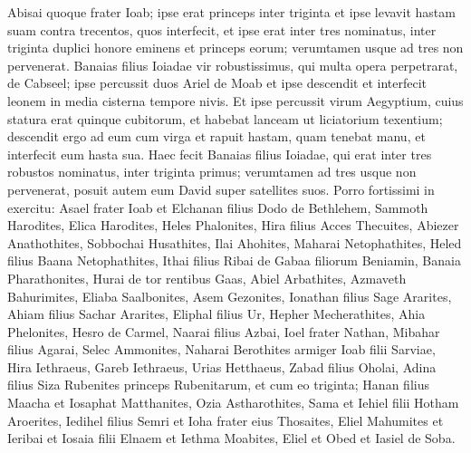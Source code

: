 \begin{biblechapter}
\verse Abisai quoque frater Ioab; ipse erat princeps inter triginta et ipse levavit hastam suam contra trecentos, quos interfecit, et ipse erat inter tres nominatus, 
\verse inter triginta duplici honore eminens et princeps eorum; verumtamen usque ad tres non pervenerat. 
\verse Banaias filius Ioiadae vir robustissimus, qui multa opera perpetrarat, de Cabseel; ipse percussit duos Ariel de Moab et ipse descendit et interfecit leonem in media cisterna tempore nivis. 
\verse Et ipse percussit virum Aegyptium, cuius statura erat quinque cubitorum, et habebat lanceam ut liciatorium texentium; descendit ergo ad eum cum virga et rapuit hastam, quam tenebat manu, et interfecit eum hasta sua.  
\verse Haec fecit Banaias filius Ioiadae, qui erat inter tres robustos nominatus,  
\verse inter triginta primus; verumtamen ad tres usque non pervenerat, posuit autem eum David super satellites suos. 
\verse Porro fortissimi in exercitu: Asael frater Ioab et Elchanan filius Dodo de Bethlehem, 
\verse Sammoth Harodites, Elica Harodites, Heles Phalonites, 
\verse Hira filius Acces Thecuites, Abiezer Anathothites, 
\verse Sobbochai Husathites, Ilai Ahohites, 
\verse Maharai Netophathites, Heled filius Baana Netophathites,  
\verse Ithai filius Ribai de Gabaa filiorum Beniamin, Banaia Pharathonites, 
\verse Hurai de tor rentibus Gaas, Abiel Arbathites, 
\verse Azmaveth Bahurimites, Eliaba Saalbonites, 
\verse Asem Gezonites, Ionathan filius Sage Ararites, 
\verse Ahiam filius Sachar Ararites, Eliphal filius Ur, 
\verse Hepher Mecherathites, Ahia Phelonites, 
\verse Hesro de Carmel, Naarai filius Azbai, 
\verse Ioel frater Nathan, Mibahar filius Agarai, 
\verse Selec Ammonites, Naharai Berothites armiger Ioab filii Sarviae, 
\verse Hira Iethraeus, Gareb Iethraeus, 
\verse Urias Hetthaeus, Zabad filius Oholai, 
\verse Adina filius Siza Rubenites princeps Rubenitarum, et cum eo triginta; 
\verse Hanan filius Maacha et Iosaphat Matthanites, 
\verse Ozia Astharothites, Sama et Iehiel filii Hotham Aroerites,  
\verse Iedihel filius Semri et Ioha frater eius Thosaites, 
\verse Eliel Mahumites et Ieribai et Iosaia filii Elnaem et Iethma Moabites, 
\verse Eliel et Obed et Iasiel de Soba. 
\end{biblechapter}

